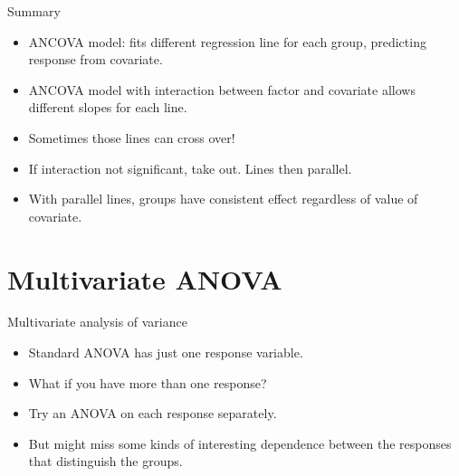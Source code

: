 \documentclass[unknownkeysallowed]{beamer}\usepackage[]{graphicx}\usepackage[]{color}
\begin{document}
\begin{frame}[fragile]{Summary}

  \begin{itemize}
  \item ANCOVA model: fits different regression line for each group,
    predicting response from covariate.
  \item ANCOVA model with interaction between factor and covariate
    allows different slopes for each line.
  \item Sometimes those lines can cross over!
  \item If interaction not significant, take out. Lines then parallel.
  \item With parallel lines, groups have consistent effect regardless
    of value of covariate.
  \end{itemize}


  
\end{frame}


\section{Multivariate ANOVA}
\frame{\sectionpage}


\begin{frame}[fragile]{Multivariate analysis of variance}

  \begin{itemize}
  \item Standard ANOVA has just one response variable.
  \item What if you have more than one response?
  \item Try an ANOVA on each response separately.
  \item But might miss some kinds of interesting dependence between the responses that distinguish the groups.
  \end{itemize}
  
\end{frame}
\end{document}
